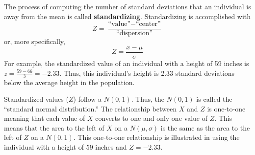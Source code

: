 \documentclass[10pt,openany]{book}\usepackage[]{graphicx}\usepackage[]{color}
\begin{document}
The process of computing the number of standard deviations that an individual is away from the mean is called \textbf{standardizing}.  Standardizing is accomplished with
\begin{equation}
  \label{eqn:Zgeneral}
    Z = \frac{\text{``value''}-\text{``center''}}{\text{``dispersion''}}
\end{equation}
or, more specifically,
\begin{equation}
  \label{eqn:Zspecific}
    Z = \frac{x-\mu}{\sigma}
\end{equation}
For example, the standardized value of an individual with a height of 59 inches is $z=\frac{59-66}{3}=-2.33$. Thus, this individual's height is 2.33 standard deviations below the average height in the population.

Standardized values ($Z$) follow a $N(0,1)$.  Thus, the $N(0,1)$ is called the ``standard normal distribution.''  The relationship between $X$ and $Z$ is one-to-one meaning that each value of $X$ converts to one and only one value of $Z$.  This means that the area to the left of $X$ on a $N(\mu,\sigma)$ is the same as the area to the left of $Z$ on a $N(0,1)$.  This one-to-one relationship is illustrated in  using the individual with a height of 59 inches and $Z=-2.33$.

\vspace{-6pt}
\end{document}
